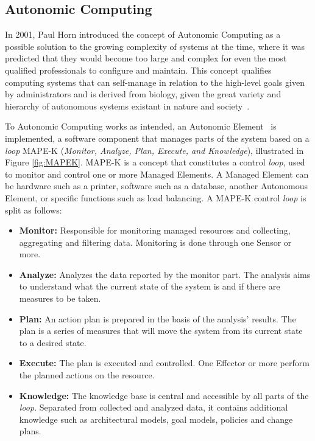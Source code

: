 \documentclass[10pt,conference]{IEEEtran}
\begin{document}
\subsection{Autonomic Computing}

In 2001, Paul Horn introduced the concept of Autonomic Computing as a possible solution to the growing complexity of systems at the time, where it was predicted that they would become too large and complex for even the most qualified professionals to configure and maintain. This concept qualifies computing systems that can self-manage in relation to the high-level goals given by administrators and is derived from biology, given the great variety and hierarchy of autonomous systems existant in nature and society~\citep{Kephart_2003}.

To Autonomic Computing works as intended, an Autonomic Element~\citep{Abbas_2010} is implemented, a software component that manages parts of the system based on a \textit{loop} MAPE-K (\textit{Monitor, Analyze, Plan, Execute, and Knowledge}), illustrated in Figure \ref{fig:MAPEK}. MAPE-K is a concept that constitutes a control \textit{loop}, used to monitor and control one or more Managed Elements. A Managed Element can be hardware such as a printer, software such as a database, another Autonomous Element, or specific functions such as load balancing. A MAPE-K control \textit{loop} is split as follows:

\begin{itemize}
\item \textbf{Monitor:} Responsible for monitoring managed resources and collecting, aggregating and filtering data. Monitoring is done through one Sensor or more.
\item \textbf{Analyze:} Analyzes the data reported by the monitor part. The analysis aims to understand what the current state of the system is and if there are measures to be taken.
\item \textbf{Plan:} An action plan is prepared in the basis of the analysis' results. The plan is a series of measures that will move the system from its current state to a desired state.
\item \textbf{Execute:} The plan is executed and controlled. One Effector or more perform the planned actions on the resource.
\item \textbf{Knowledge:} The knowledge base is central and accessible by all parts of the \textit{loop}. Separated from collected and analyzed data, it contains additional knowledge such as architectural models, goal models, policies and change plans.
\end{itemize}
\end{document}
